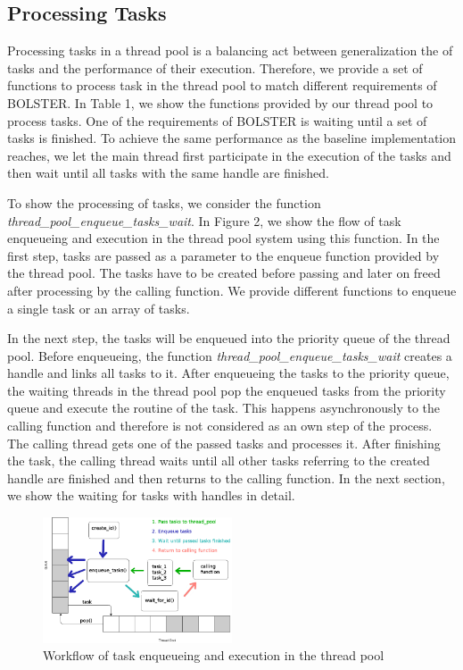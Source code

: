 \documentclass[conference]{IEEEtran}
\begin{document}
\subsection{Processing Tasks}
Processing tasks in a thread pool is a balancing act between generalization the of tasks and the performance of their execution. Therefore, we provide a set of functions to process task in the thread pool to match different requirements of BOLSTER. In Table 1, we show the functions provided by our thread pool to process tasks. One of the requirements of BOLSTER is waiting until a set of tasks is finished. To achieve the same performance as the baseline implementation reaches, we let the main thread first participate in the execution of the tasks and then wait until all tasks with the same handle are finished.

To show the processing of tasks, we consider the function \emph{thread\_pool\_enqueue\_tasks\_wait}. In Figure 2, we show the flow of task enqueueing and execution in the thread pool system using this function. In the first step, tasks are passed as a parameter to the enqueue function provided by the thread pool. The tasks have to be created before passing and later on freed after processing by the calling function.  We provide different functions to enqueue a single task or an array of tasks.

In the next step, the tasks will be enqueued into the priority queue of the thread pool. Before enqueueing, the function \emph{thread\_pool\_enqueue\_tasks\_wait} creates a handle and links all tasks to it. After enqueueing the tasks to the priority queue, the waiting threads in the thread pool pop the enqueued tasks from the priority queue and execute the routine of the task. This happens asynchronously to the calling function and therefore is not considered as an own step of the process. The calling thread gets one of the passed tasks and processes it. After finishing the task, the calling thread waits until all other tasks referring to the created handle are finished and then returns to the calling function. In the next section, we show the waiting for tasks with handles in detail.

\begin{figure}
	\includegraphics[width=0.5\textwidth]{img/pool_queue.png}
	\caption{Workflow of task enqueueing and execution in the thread pool}
	\label{fig1}
\end{figure}
\end{document}
